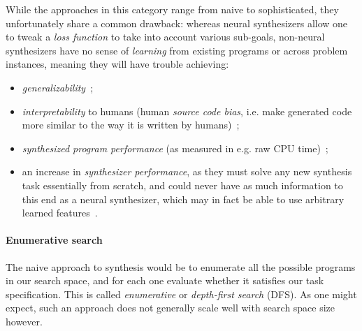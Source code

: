 \documentclass{article}
\begin{document}
While the approaches in this category range from naive to sophisticated,
they unfortunately share a common drawback:
whereas neural synthesizers allow one to tweak a \emph{loss function} to take into account various sub-goals,
non-neural synthesizers have no sense of \emph{learning}
from existing programs or across problem instances,
meaning they will have trouble achieving:
\begin{itemize}
    \item \emph{generalizability}~\citep{nps};
    \item \emph{interpretability} to humans (human \emph{source code bias}, i.e. make generated code more similar to the way it is written by humans)~\citep{nps};
    \item \emph{synthesized program performance} (as measured in e.g. raw CPU time)~\citep{schkufza2016stochastic};
    \item an increase in \emph{synthesizer performance},
    as they must solve any new synthesis task essentially from scratch,
    and could never have as much information to this end as a neural synthesizer,
    which may in fact be able to use arbitrary learned features~\citep{odena2020learning}.
\end{itemize}

\paragraph{Enumerative search}

The naive approach to synthesis would be to enumerate all the possible programs in our search space,
and for each one evaluate whether it satisfies our task specification.
This is called \emph{enumerative} or \emph{depth-first search} (DFS).
As one might expect, such an approach does not generally scale well with search space size however.



\end{document}
